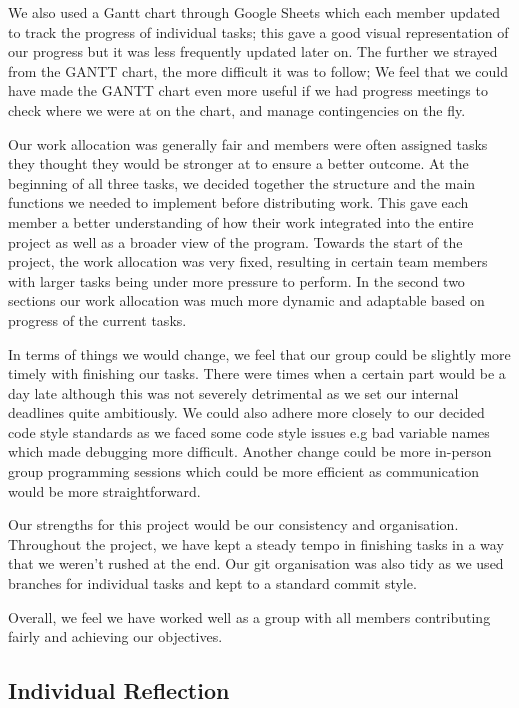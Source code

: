 \documentclass[11pt]{article}
\begin{document}
We also used a Gantt chart through Google Sheets which each member updated to track the progress of individual tasks; this gave a good visual representation of our progress but it was less frequently updated later on. The further we strayed from the GANTT chart, the more difficult it was to follow; We feel that we could have made the GANTT chart even more useful if we had progress meetings to check where we were at on the chart, and manage contingencies on the fly. 

Our work allocation was generally fair and members were often assigned tasks they thought they would be stronger at to ensure a better outcome. At the beginning of all three tasks, we decided together the structure and the main functions we needed to implement before distributing work. This gave each member a better understanding of how their work integrated into the entire project as well as a broader view of the program. Towards the start of the project, the work allocation was very fixed, resulting in certain team members with larger tasks being under more pressure to perform. In the second two sections our work allocation was much more dynamic and adaptable based on progress of the current tasks.

In terms of things we would change, we feel that our group could be slightly more timely with finishing our tasks. There were times when a certain part would be a day late although this was not severely detrimental as we set our internal deadlines quite ambitiously. We could also adhere more closely to our decided code style standards as we faced some code style issues e.g bad variable names which made debugging more difficult. Another change could be more in-person group programming sessions which could be more efficient as communication would be more straightforward.

Our strengths for this project would be our consistency and organisation. Throughout the project, we have kept a steady tempo in finishing tasks in a way that we weren't rushed at the end. Our git organisation was also tidy as we used branches for individual tasks and kept to a standard commit style.

Overall, we feel we have worked well as a group with all members contributing fairly and achieving our objectives.
  \subsection*{Individual Reflection}
\end{document}
